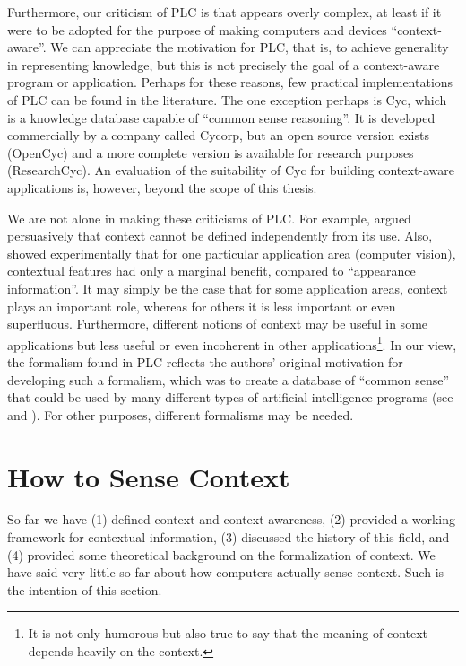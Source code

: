 Furthermore, our criticism of PLC is that appears overly complex, at least if it were to be adopted for the purpose of making computers and devices ``context-aware''. We can appreciate the motivation for PLC, that is, to achieve generality in representing knowledge, but this is not precisely the goal of a context-aware program or application. Perhaps for these reasons, few practical implementations of PLC can be found in the literature. The one exception perhaps is Cyc, which is a knowledge database capable of ``common sense reasoning''. It is developed commercially by a company called Cycorp, but an open source version exists (OpenCyc) and a more complete version is available for research purposes (ResearchCyc). An evaluation of the suitability of Cyc for building context-aware applications is, however, beyond the scope of this thesis.

We are not alone in making these criticisms of PLC. For example, \cite{hirst1997context} argued persuasively that context cannot be defined independently from its use. Also, \cite{wolf2006critical} showed experimentally that for one particular application area (computer vision), contextual features had only a marginal benefit, compared to ``appearance information''. It may simply be the case that for some application areas, context plays an important role, whereas for others it is less important or even superfluous. Furthermore, different notions of context may be useful in some applications but less useful or even incoherent in other applications\footnote{It is not only humorous but also true to say that the meaning of context depends heavily on the context.}. In our view, the formalism found in PLC reflects the authors' original motivation for developing such a formalism, which was to create a database of ``common sense'' that could be used by many different types of artificial intelligence programs (see \cite{mccarthy1969some} and \cite{mccarthy1984some}). For other purposes, different formalisms may be needed.

%
%
\section{How to Sense Context}
\label{sec:how}
So far we have (1) defined context and context awareness, (2) provided a working framework for contextual information, (3) discussed the history of this field, and (4) provided some theoretical background on the formalization of context. We have said very little so far about how computers actually sense context. Such is the intention of this section.

